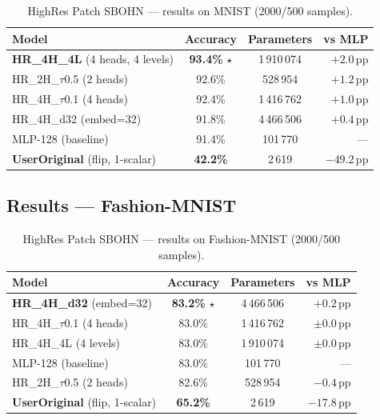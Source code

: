 \documentclass[11pt,a4paper]{report}
\begin{document}
\begin{table}[h]
\centering
\caption{HighRes Patch SBOHN --- results on MNIST (2000/500 samples).}
\begin{tabular}{lccr}
\hline
\textbf{Model} & \textbf{Accuracy} & \textbf{Parameters} & \textbf{vs MLP} \\
\hline
\textbf{HR\_4H\_4L} (4 heads, 4 levels) & \textbf{93.4\%} $\star$ & 1\,910\,074 & $+2.0$\,pp \\
HR\_2H\_$\tau$0.5 (2 heads)              & 92.6\%                  & 528\,954   & $+1.2$\,pp \\
HR\_4H\_$\tau$0.1 (4 heads)              & 92.4\%                  & 1\,416\,762 & $+1.0$\,pp \\
HR\_4H\_d32 (embed=32)                     & 91.8\%                  & 4\,466\,506 & $+0.4$\,pp \\
MLP-128 (baseline)                          & 91.4\%                  & 101\,770   & --- \\
\textbf{UserOriginal} (flip, 1-scalar)      & \textbf{42.2\%}         & 2\,619     & $-49.2$\,pp \\
\hline
\end{tabular}
\end{table}

\subsection{Results --- Fashion-MNIST}

\begin{table}[h]
\centering
\caption{HighRes Patch SBOHN --- results on Fashion-MNIST (2000/500 samples).}
\begin{tabular}{lccr}
\hline
\textbf{Model} & \textbf{Accuracy} & \textbf{Parameters} & \textbf{vs MLP} \\
\hline
\textbf{HR\_4H\_d32} (embed=32)             & \textbf{83.2\%} $\star$ & 4\,466\,506 & $+0.2$\,pp \\
HR\_4H\_$\tau$0.1 (4 heads)              & 83.0\%                  & 1\,416\,762 & $\pm 0.0$\,pp \\
HR\_4H\_4L (4 levels)                     & 83.0\%                  & 1\,910\,074 & $\pm 0.0$\,pp \\
MLP-128 (baseline)                          & 83.0\%                  & 101\,770   & --- \\
HR\_2H\_$\tau$0.5 (2 heads)              & 82.6\%                  & 528\,954   & $-0.4$\,pp \\
\textbf{UserOriginal} (flip, 1-scalar)      & \textbf{65.2\%}         & 2\,619     & $-17.8$\,pp \\
\hline
\end{tabular}
\end{table}
\end{document}
